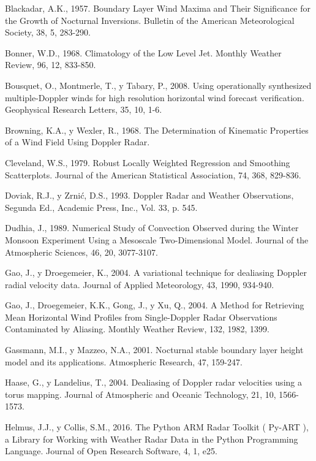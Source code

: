 \documentclass[12pt,spanish,oneside]{book}
\begin{document}
\hypertarget{ref-Blackadar1957}{}
Blackadar, A.K., 1957. Boundary Layer Wind Maxima and Their Significance
for the Growth of Nocturnal Inversions. Bulletin of the American
Meteorological Society, 38, 5, 283-290.

\hypertarget{ref-Bonner1968}{}
Bonner, W.D., 1968. Climatology of the Low Level Jet. Monthly Weather
Review, 96, 12, 833-850.

\hypertarget{ref-Bousquet2008}{}
Bousquet, O., Montmerle, T., y Tabary, P., 2008. Using operationally
synthesized multiple-Doppler winds for high resolution horizontal wind
forecast verification. Geophysical Research Letters, 35, 10, 1-6.

\hypertarget{ref-Browning1968}{}
Browning, K.A., y Wexler, R., 1968. The Determination of Kinematic
Properties of a Wind Field Using Doppler Radar.

\hypertarget{ref-Cleveland1979}{}
Cleveland, W.S., 1979. Robust Locally Weighted Regression and Smoothing
Scatterplots. Journal of the American Statistical Association, 74, 368,
829-836.

\hypertarget{ref-Doviak1993}{}
Doviak, R.J., y Zrnić, D.S., 1993. Doppler Radar and Weather
Observations, Segunda Ed., Academic Press, Inc., Vol. 33, p. 545.

\hypertarget{ref-Dudhia1989}{}
Dudhia, J., 1989. Numerical Study of Convection Observed during the
Winter Monsoon Experiment Using a Mesoscale Two-Dimensional Model.
Journal of the Atmospheric Sciences, 46, 20, 3077-3107.

\hypertarget{ref-Gao2004}{}
Gao, J., y Droegemeier, K., 2004. A variational technique for dealiasing
Doppler radial velocity data. Journal of Applied Meteorology, 43, 1990,
934-940.

\hypertarget{ref-Gao2004a}{}
Gao, J., Droegemeier, K.K., Gong, J., y Xu, Q., 2004. A Method for
Retrieving Mean Horizontal Wind Profiles from Single-Doppler Radar
Observations Contaminated by Aliasing. Monthly Weather Review, 132,
1982, 1399.

\hypertarget{ref-Gassmann2001}{}
Gassmann, M.I., y Mazzeo, N.A., 2001. Nocturnal stable boundary layer
height model and its applications. Atmospheric Research, 47, 159-247.

\hypertarget{ref-Haase2004}{}
Haase, G., y Landelius, T., 2004. Dealiasing of Doppler radar velocities
using a torus mapping. Journal of Atmospheric and Oceanic Technology,
21, 10, 1566-1573.

\hypertarget{ref-Helmus2016}{}
Helmus, J.J., y Collis, S.M., 2016. The Python ARM Radar Toolkit (
Py-ART ), a Library for Working with Weather Radar Data in the Python
Programming Language. Journal of Open Research Software, 4, 1, e25.
\end{document}
